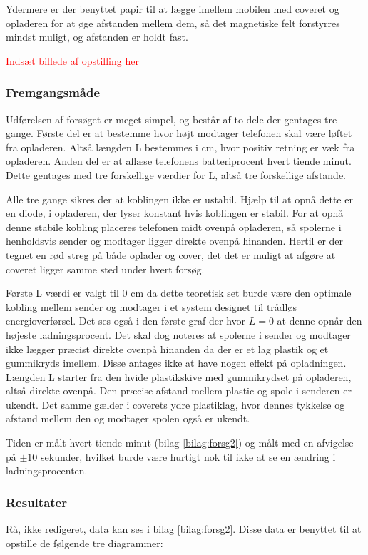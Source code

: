 Ydermere er der benyttet papir til at lægge imellem mobilen med coveret og opladeren for at øge afstanden mellem dem, så det magnetiske felt forstyrres mindst muligt, og afstanden er holdt fast. 

\textcolor{red}{Indsæt billede af opstilling her} 

\subsubsection{Fremgangsmåde}

Udførelsen af forsøget er meget simpel, og består af to dele der gentages tre gange. Første del er at bestemme hvor højt modtager telefonen skal være løftet fra opladeren. Altså længden L bestemmes i cm, hvor positiv retning er væk fra opladeren. Anden del er at aflæse telefonens batteriprocent hvert tiende minut. Dette gentages med tre forskellige værdier for L, altså tre forskellige afstande.

Alle tre gange sikres der at koblingen ikke er ustabil. Hjælp til at opnå dette er en diode, i opladeren, der lyser konstant hvis koblingen er stabil. For at opnå denne stabile kobling placeres telefonen midt ovenpå opladeren, så spolerne i henholdsvis sender og modtager ligger direkte ovenpå hinanden. Hertil er der tegnet en rød streg på både oplader og cover, det det er muligt at afgøre at coveret ligger samme sted under hvert forsøg.

Første L værdi er valgt til 0 cm da dette teoretisk set burde være den optimale kobling mellem sender og modtager i et system designet til trådløs energioverførsel. Det ses også i den første graf der hvor $L = 0$ at denne opnår den højeste ladningsprocent. Det skal dog noteres at spolerne i sender og modtager ikke lægger præcist direkte ovenpå hinanden da der er et lag plastik og et gummikryds imellem. Disse antages ikke at have nogen effekt på opladningen. Længden L starter fra den hvide plastikskive med gummikrydset på opladeren, altså direkte ovenpå. Den præcise afstand mellem plastic og spole i senderen er ukendt. Det samme gælder i coverets ydre plastiklag, hvor dennes tykkelse og afstand mellem den og modtager spolen også er ukendt.

Tiden er målt hvert tiende minut (bilag \ref{bilag:forsg2}) og målt med en afvigelse på $\pm 10$ sekunder, hvilket burde være hurtigt nok til ikke at se en ændring i ladningsprocenten.

\subsubsection{Resultater}
Rå, ikke redigeret, data kan ses i bilag \ref{bilag:forsg2}. Disse data er benyttet til at opstille de følgende tre diagrammer:

